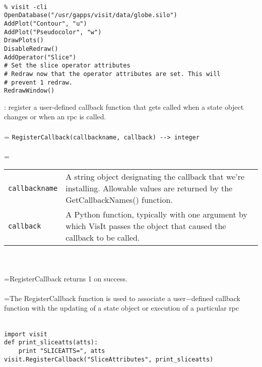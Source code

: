 \documentclass[10pt,a4paper]{report}
\begin{document}
\\[-6mm]
\begin{verbatim}% visit -cli
OpenDatabase("/usr/gapps/visit/data/globe.silo")
AddPlot("Contour", "u")
AddPlot("Pseudocolor", "w")
DrawPlots()
DisableRedraw()
AddOperator("Slice")
# Set the slice operator attributes
# Redraw now that the operator attributes are set. This will 
# prevent 1 redraw.
RedrawWindow()
\end{verbatim}
\newpage


{}
: register a user-defined callback function that gets called when a state object changes or when an rpc is called.\\[-3mm]

 \\ 
\hangindent=\parindent 
\verb!RegisterCallback(callbackname, callback) --> integer!\\ [-3mm]

 \\ 
\hangindent=\parindent 
\begin{tabular}{lp{9cm}}
\verb!callbackname! & A string object designating the callback that we're installing. Allowable values are returned by the GetCallbackNames() function. \\
\verb!callback! & A Python function, typically with one argument by which VisIt passes the object that caused the callback to be called. \\
\end{tabular} \\[-2mm]


 \\ 
\hangindent=\parindent RegisterCallback returns 1 on success. \\[-3mm] 

 \\ 
\hangindent=\parindent The RegisterCallback function is used to associate a user$-$defined callback function with the updating of a state object or execution of a particular rpc \\[-3mm] 

\\[-6mm]
\begin{verbatim}import visit
def print_sliceatts(atts):
    print "SLICEATTS=", atts
visit.RegisterCallback("SliceAttributes", print_sliceatts)
\end{verbatim}
\newpage
\end{document}
